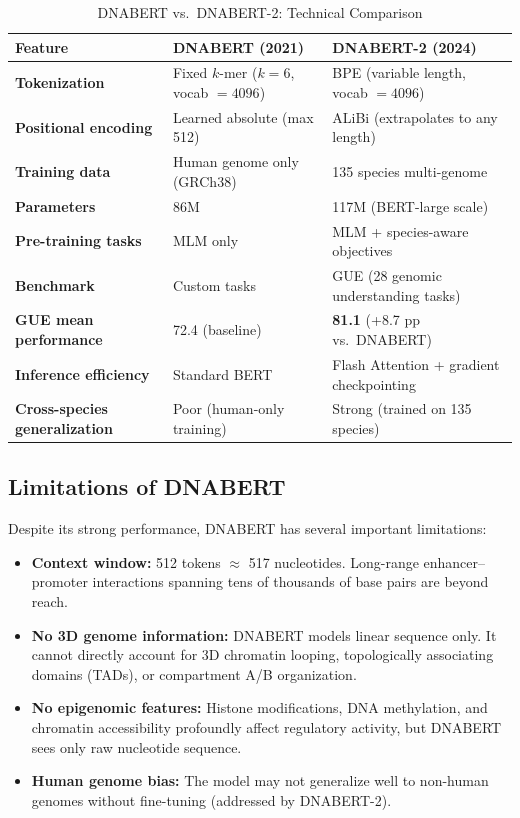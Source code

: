 ﻿\documentclass[12pt,a4paper]{article}
\begin{document}
\begin{table}[H]
\centering
\caption{DNABERT vs.\ DNABERT-2: Technical Comparison}
\begin{tabularx}{\textwidth}{>{\bfseries\small}p{3.5cm} >{\small}X >{\small}X}
\toprule
\rowcolor{primaryblue}
\color{white}\textbf{Feature} & \color{white}\textbf{DNABERT (2021)} & \color{white}\textbf{DNABERT-2 (2024)} \\
\midrule
\rowcolor{lightblue!40}
Tokenization & Fixed $k$-mer ($k=6$, vocab $= 4096$) & BPE (variable length, vocab $= 4096$) \\
\addlinespace
Positional encoding & Learned absolute (max 512) & ALiBi (extrapolates to any length) \\
\addlinespace
\rowcolor{lightblue!40}
Training data & Human genome only (GRCh38) & 135 species multi-genome \\
\addlinespace
Parameters & 86M & 117M (BERT-large scale) \\
\addlinespace
\rowcolor{lightblue!40}
Pre-training tasks & MLM only & MLM + species-aware objectives \\
\addlinespace
Benchmark & Custom tasks & GUE (28 genomic understanding tasks) \\
\addlinespace
\rowcolor{lightblue!40}
GUE mean performance & 72.4 (baseline) & \textbf{81.1} (+8.7 pp vs.\ DNABERT) \\
\addlinespace
Inference efficiency & Standard BERT & Flash Attention + gradient checkpointing \\
\addlinespace
\rowcolor{lightblue!40}
Cross-species generalization & Poor (human-only training) & Strong (trained on 135 species) \\
\bottomrule
\end{tabularx}
\end{table}

\subsection{Limitations of DNABERT}

Despite its strong performance, DNABERT has several important limitations:
\begin{itemize}[leftmargin=*, itemsep=4pt]
  \item \textbf{Context window:} 512 tokens $\approx$ 517 nucleotides. Long-range enhancer--promoter interactions spanning tens of thousands of base pairs are beyond reach.
  \item \textbf{No 3D genome information:} DNABERT models linear sequence only. It cannot directly account for 3D chromatin looping, topologically associating domains (TADs), or compartment A/B organization.
  \item \textbf{No epigenomic features:} Histone modifications, DNA methylation, and chromatin accessibility profoundly affect regulatory activity, but DNABERT sees only raw nucleotide sequence.
  \item \textbf{Human genome bias:} The model may not generalize well to non-human genomes without fine-tuning (addressed by DNABERT-2).
\end{itemize}
\end{document}
